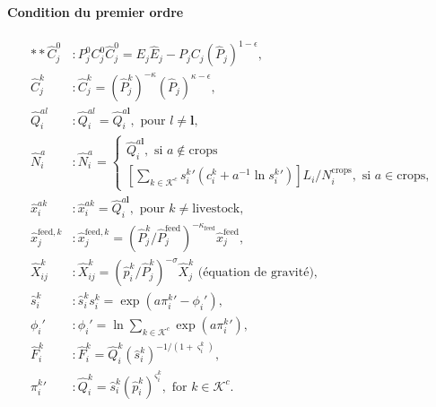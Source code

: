 \paragraph{Condition du premier ordre}
\begin{align}
	** \hat{C}_j^0            & : P_j^0 C_j^0 \hat{C}_j^0 = E_j \hat{E}_j - P_jC_j (\hat{P}_j)^{1 - \epsilon},                                                      \\
	\hat{C}_j^k               & : \hat{C}_j^k = (\hat{P}_j^k)^{-\kappa} (\hat{P}_j)^{\kappa - \epsilon},                                                            \\
	\hat{Q}_i^{al}            & : \hat{Q}_i^{al}=\hat{Q}_i^{a \mathbf{l}}, \text{ pour } l \neq \mathbf{l},                                                         \\
	\hat{N}_i^a               & : \hat{N}_i^a=
	\begin{cases}
		\hat{Q}_i^{a \mathbf{l}}, \text{ si } a \notin \text{crops} \\
		\left[\sum_{k \in \mathcal{K}^c} {s_i^k}\prime \left(c_i^k+a^{-1} \ln {s_i^k}\prime  \right) \right] L_i / N_i^{\text{crops}}, \text{ si } a \in \text{crops},
	\end{cases}                                    \\
	\hat{x}_i^{ak}            & :\hat{x}_i^{ak}=\hat{Q}_i^{a \mathbf{l}}, \text{ pour } k \neq \text{livestock},                                                    \\
	\hat{x}^{\text{feed},k}_j & : \hat{x}^{\text{feed},k}_j = \left({\hat{P}_j^k} /{\hat{P}_j^{\text{feed}}} \right)^{-\kappa_{\text{feed}}} \hat{x}_j^\text{feed}, \\
	\hat{X}_{ij}^k            & : \hat{X}_{ij}^k = (\hat{p}_i^k/\hat{P}_j^k)^{-\sigma} \hat{X}_j^k \text{ (équation de gravité)},                                   \\
	\hat{s}_{i}^{k}           & : \hat{s}_i^k s_i^k =\exp \left( a {\pi_i^k}\prime - \phi_i\prime \right),                                                          \\
	\phi_i\prime              & : \phi_i\prime = \ln \sum_{k \in \mathcal{K}^c} \exp(a {\pi_i^k}\prime),                                                            \\
	\hat{F}_i^k               & : \hat{F}_i^k = \hat{Q}_i^k (\hat{s}_i^k)^{- 1 / (1 + \varsigma_i^k)},                                                              \\
	{\pi_i^k}\prime           & : \hat{Q}_i^k = \hat{s}_i^k \left(\hat{p}_i^k \right)^{\varsigma_i^k}, \text{ for } k\in \mathcal{K}^{c}.
\end{align}

